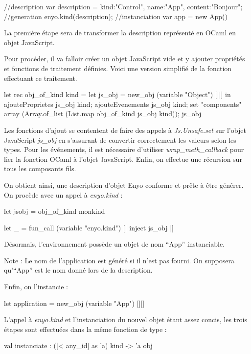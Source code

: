 \documentclass[11pt,a4paper]{report}
\begin{document}
\begin{JavaScript}
  //description
  var description = {kind:"Control", name:"App", content:"Bonjour"};
  //generation
  enyo.kind(description);
  //instanciation
  var app = new App()
\end{JavaScript}

La première étape sera de transformer la description représenté en OCaml en objet JavaScript.

Pour procéder, il va falloir créer un objet JavaScript vide et y ajouter propriétés et fonctions
de traitement définies. Voici une version simplifié de la fonction effectuant ce traitement.

\begin{OCaml}
  let rec obj_of_kind kind = 
      let js_obj = new_obj (variable "Object") [||] in
          ajouteProprietes js_obj kind;
          ajouteEvenements js_obj kind;
          set "components" array (Array.of_list (List.map obj_of_kind js_obj kind));
          js_obj
\end{OCaml}

Les fonctions d'ajout se contentent de faire des appels à 
\emph{Js.Unsafe.set} sur l'objet JavaScript \emph{js\_obj} en s'assurant de convertir
correctement les valeurs selon les types. Pour les événements, il est nécessaire
d'utiliser \emph{wrap\_meth\_callback} pour lier la fonction OCaml à l'objet JavaScript.
Enfin, on effectue une récursion sur tous les composants fils.

On obtient ainsi, une description d'objet Enyo conforme et prête à être générer.
On procède avec un appel à \emph{enyo.kind} :

\begin{OCaml}
  let jsobj = obj_of_kind monkind
  
  let _ = fun_call (variable "enyo.kind") [| inject js_obj |]
\end{OCaml}

Désormais, l'environnement possède un objet de nom ``App'' instanciable.

Note : Le nom de l'application est généré si il n'est pas fourni. On supposera qu'``App'' est
le nom donné lors de la description.

Enfin, on l'instancie :
\begin{OCaml}
  let application = new_obj (variable "App") [||]
\end{OCaml}

L'appel à \emph{enyo.kind} et l'instanciation du nouvel objet étant assez concis,
les trois étapes sont effectuées dans la même fonction de type : 
\begin{OCaml}
  val instanciate : ([< any_id] as 'a) kind -> 'a obj
\end{OCaml}
\end{document}
